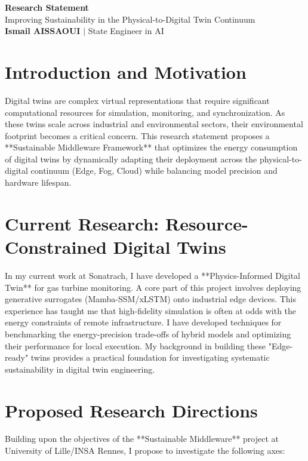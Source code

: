 \documentclass[a4paper,11pt]{article}
\begin{document}
\begin{center}
    {\LARGE\bfseries\color{titleblue} Research Statement}\\[6pt]
    {\large Improving Sustainability in the Physical-to-Digital Twin Continuum}\\[4pt]
    \textbf{Ismail AISSAOUI} $|$ State Engineer in AI
\end{center}

\bigskip

\section{Introduction and Motivation}
Digital twins are complex virtual representations that require significant computational resources for simulation, monitoring, and synchronization. As these twins scale across industrial and environmental sectors, their environmental footprint becomes a critical concern. This research statement proposes a **Sustainable Middleware Framework** that optimizes the energy consumption of digital twins by dynamically adapting their deployment across the physical-to-digital continuum (Edge, Fog, Cloud) while balancing model precision and hardware lifespan.

\section{Current Research: Resource-Constrained Digital Twins}
In my current work at Sonatrach, I have developed a **Physics-Informed Digital Twin** for gas turbine monitoring. A core part of this project involves deploying generative surrogates (Mamba-SSM/xLSTM) onto industrial edge devices. This experience has taught me that high-fidelity simulation is often at odds with the energy constraints of remote infrastructure. I have developed techniques for benchmarking the energy-precision trade-offs of hybrid models and optimizing their performance for local execution. My background in building these "Edge-ready" twins provides a practical foundation for investigating systematic sustainability in digital twin engineering.

\section{Proposed Research Directions}
Building upon the objectives of the **Sustainable Middleware** project at University of Lille/INSA Rennes, I propose to investigate the following axes:
\end{document}
